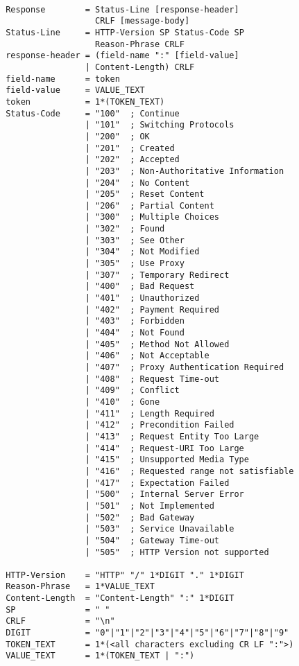 \documentclass[a4paper,11pt]{report}
\begin{document}
\begin{lstlisting}

 Response        = Status-Line [response-header] 
                   CRLF [message-body]
 Status-Line     = HTTP-Version SP Status-Code SP 
                   Reason-Phrase CRLF 
 response-header = (field-name ":" [field-value] 
                 | Content-Length) CRLF
 field-name      = token
 field-value     = VALUE_TEXT
 token           = 1*(TOKEN_TEXT)
 Status-Code     = "100"  ; Continue
                 | "101"  ; Switching Protocols
                 | "200"  ; OK
                 | "201"  ; Created
                 | "202"  ; Accepted
                 | "203"  ; Non-Authoritative Information
                 | "204"  ; No Content
                 | "205"  ; Reset Content
                 | "206"  ; Partial Content
                 | "300"  ; Multiple Choices
                 | "302"  ; Found
                 | "303"  ; See Other
                 | "304"  ; Not Modified
                 | "305"  ; Use Proxy
                 | "307"  ; Temporary Redirect
                 | "400"  ; Bad Request
                 | "401"  ; Unauthorized
                 | "402"  ; Payment Required
                 | "403"  ; Forbidden
                 | "404"  ; Not Found
                 | "405"  ; Method Not Allowed
                 | "406"  ; Not Acceptable
                 | "407"  ; Proxy Authentication Required
                 | "408"  ; Request Time-out
                 | "409"  ; Conflict
                 | "410"  ; Gone
                 | "411"  ; Length Required
                 | "412"  ; Precondition Failed
                 | "413"  ; Request Entity Too Large
                 | "414"  ; Request-URI Too Large
                 | "415"  ; Unsupported Media Type
                 | "416"  ; Requested range not satisfiable
                 | "417"  ; Expectation Failed
                 | "500"  ; Internal Server Error
                 | "501"  ; Not Implemented
                 | "502"  ; Bad Gateway
                 | "503"  ; Service Unavailable
                 | "504"  ; Gateway Time-out
                 | "505"  ; HTTP Version not supported

 HTTP-Version    = "HTTP" "/" 1*DIGIT "." 1*DIGIT
 Reason-Phrase   = 1*VALUE_TEXT
 Content-Length  = "Content-Length" ":" 1*DIGIT 
 SP              = " "
 CRLF            = "\n"
 DIGIT           = "0"|"1"|"2"|"3"|"4"|"5"|"6"|"7"|"8"|"9"
 TOKEN_TEXT      = 1*(<all characters excluding CR LF ":">)
 VALUE_TEXT      = 1*(TOKEN_TEXT | ":")

\end{lstlisting}
\end{document}
